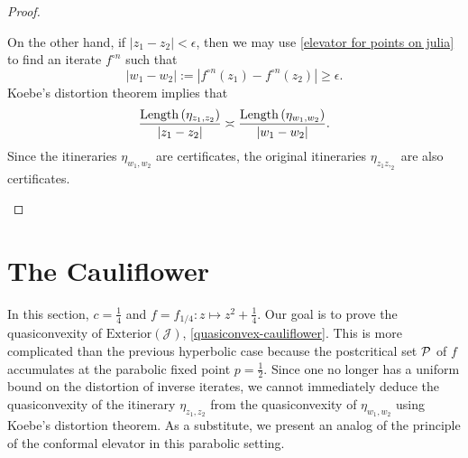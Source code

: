 \begin{proof}
\begin{enumerate}[label=\normalfont(\roman*)]
On the other hand, if $\left|z_{1}-z_{2}\right|<\epsilon$, then
we may use  \cref{elevator for points on julia} to find an iterate $f^{\circ n}$ such that 
\begin{equation}
	|w_1-w_2|:=\left|f^{\circ n}(z_{1})-f^{\circ n}(z_{2})\right|\geq\epsilon.
\end{equation}
Koebe's distortion theorem implies that 
\begin{equation}
	\frac{\operatorname{Length}\left(\eta_{z_{1},z_{2}}\right)}{|z_1-z_2|}\asymp\frac{\operatorname{Length}\left(\eta_{w_1,w_2}\right)}{|w_1-w_2|}.
\end{equation}
Since the itineraries $\eta_{w_1,w_2}$ are certificates, the original itineraries $\eta_{z_1z,_2}$ are also certificates. 
\begin{comment}
By a distortion estimate
\begin{equation*}
\Length\left(\eta_{z_{0},z_{1}}\right)\asymp\frac{\Length\left(\eta_{w_0,w_1}\right)}{\left|\left(f^{\circ n}\right)'\left(\zeta\right)\right|}
\end{equation*}
 for some point $\zeta \in \mathcal{J}$. The denominator grows
with $n$ exponentially at rate $\theta$, while the numerator has
a bound of the form 
\[
\Length\left(\eta_{w_1,w_2}\right)\lesssim\left|w_1-w_2\right|\lesssim\theta^{n}\left|z_{1}-z_{2}\right|.
\]
Altogether 
\[
\Length\left(\eta_{z_{1},z_{2}}\right)\lesssim\frac{\theta^{n}\left|z_{1}-z_{2}\right|}{\theta^{n}}=\left|z_{1}-z_{2}\right|
\]
 so $\eta_{z_{1},z_{2}}$ is a quasiconvexity certificate.
\end{comment}
\end{enumerate}
\end{proof}

\section{The Cauliflower}
In this section, $c=\frac 14$ and $f=f_{1/4}: z\mapsto z^2+ \frac 14$.
Our goal is to prove the quasiconvexity of $\mathrm{Exterior}(\mathcal{J})$, \cref{quasiconvex-cauliflower}. This is more complicated than the previous hyperbolic case because the postcritical set $\operatorname{\mathcal P}$ of $f$ accumulates at the parabolic fixed point $p=\frac 12$. Since one no longer has a uniform bound on the distortion of inverse iterates, we cannot immediately deduce the quasiconvexity of the itinerary $\eta_{z_1,z_2}$ from the quasiconvexity of $\eta_{w_1,w_2}$ using Koebe's distortion theorem. As a substitute, we present an analog of the principle of the conformal elevator in this parabolic setting.

